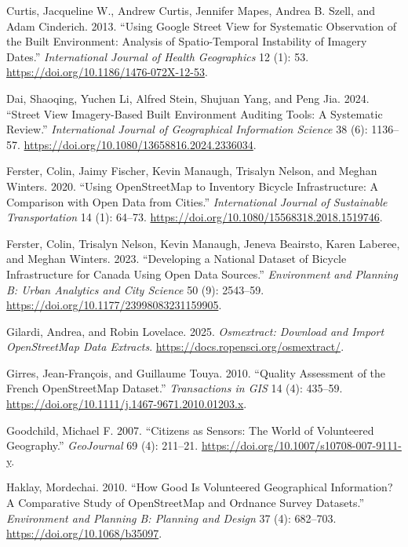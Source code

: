 \documentclass[
]{article}
\newlength{\cslhangindent}
\newenvironment{CSLReferences}[2] %
 {\begin{list}{}{%
  \setlength{\itemindent}{0pt}
  \setlength{\leftmargin}{0pt}
  \setlength{\parsep}{0pt}
  \ifodd #1
   \setlength{\leftmargin}{\cslhangindent}
   \setlength{\itemindent}{-1\cslhangindent}
  \fi
  \setlength{\itemsep}{#2\baselineskip}}}
 {\end{list}}
\begin{document}
\begin{CSLReferences}{1}{1}
Curtis, Jacqueline W., Andrew Curtis, Jennifer Mapes, Andrea B. Szell,
and Adam Cinderich. 2013. {``Using Google Street View for Systematic
Observation of the Built Environment: Analysis of Spatio-Temporal
Instability of Imagery Dates.''} \emph{International Journal of Health
Geographics} 12 (1): 53. \url{https://doi.org/10.1186/1476-072X-12-53}.

Dai, Shaoqing, Yuchen Li, Alfred Stein, Shujuan Yang, and Peng Jia.
2024. {``Street View Imagery-Based Built Environment Auditing Tools: A
Systematic Review.''} \emph{International Journal of Geographical
Information Science} 38 (6): 1136--57.
\url{https://doi.org/10.1080/13658816.2024.2336034}.

Ferster, Colin, Jaimy Fischer, Kevin Manaugh, Trisalyn Nelson, and
Meghan Winters. 2020. {``Using {OpenStreetMap} to Inventory Bicycle
Infrastructure: {A} Comparison with Open Data from Cities.''}
\emph{International Journal of Sustainable Transportation} 14 (1):
64--73. \url{https://doi.org/10.1080/15568318.2018.1519746}.

Ferster, Colin, Trisalyn Nelson, Kevin Manaugh, Jeneva Beairsto, Karen
Laberee, and Meghan Winters. 2023. {``Developing a National Dataset of
Bicycle Infrastructure for {Canada} Using Open Data Sources.''}
\emph{Environment and Planning B: Urban Analytics and City Science} 50
(9): 2543--59. \url{https://doi.org/10.1177/23998083231159905}.

Gilardi, Andrea, and Robin Lovelace. 2025. \emph{Osmextract: Download
and Import OpenStreetMap Data Extracts}.
\url{https://docs.ropensci.org/osmextract/}.

Girres, Jean‐François, and Guillaume Touya. 2010. {``Quality
{Assessment} of the {French} {OpenStreetMap} {Dataset}.''}
\emph{Transactions in GIS} 14 (4): 435--59.
\url{https://doi.org/10.1111/j.1467-9671.2010.01203.x}.

Goodchild, Michael F. 2007. {``Citizens as Sensors: The World of
Volunteered Geography.''} \emph{GeoJournal} 69 (4): 211--21.
\url{https://doi.org/10.1007/s10708-007-9111-y}.

Haklay, Mordechai. 2010. {``How {Good} Is {Volunteered} {Geographical}
{Information}? {A} {Comparative} {Study} of {OpenStreetMap} and
{Ordnance} {Survey} {Datasets}.''} \emph{Environment and Planning B:
Planning and Design} 37 (4): 682--703.
\url{https://doi.org/10.1068/b35097}.


\end{CSLReferences}
\end{document}
